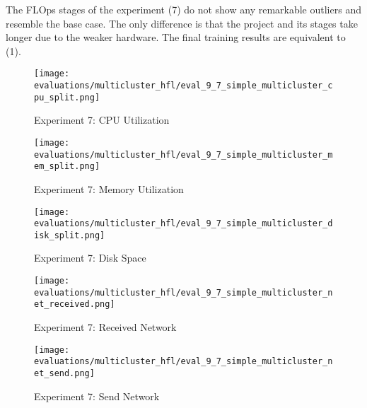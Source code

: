 The FLOps stages of the experiment (7) do not show any remarkable outliers and resemble the base case.
The only difference is that the project and its stages take longer due to the weaker hardware.
The final training results are equivalent to (1).

\begin{figure}[H]
    \begin{adjustwidth}{-0.2\paperwidth}{-0.2\paperwidth}
        \centering
        \texttt{[image: evaluations/multicluster\_hfl/eval\_9\_7\_simple\_multicluster\_cpu\_split.png]}
        \caption{Experiment 7: CPU Utilization}
        \label{fig:eval_7_cpu}
    \end{adjustwidth}
\end{figure}

\begin{figure}[H]
    \begin{adjustwidth}{-0.2\paperwidth}{-0.2\paperwidth}
        \centering
        \texttt{[image: evaluations/multicluster\_hfl/eval\_9\_7\_simple\_multicluster\_mem\_split.png]}
        \caption{Experiment 7: Memory Utilization}
        \label{fig:eval_7_mem}
    \end{adjustwidth}
\end{figure}

\begin{figure}[H]
    \begin{adjustwidth}{-0.2\paperwidth}{-0.2\paperwidth}
        \centering
        \texttt{[image: evaluations/multicluster\_hfl/eval\_9\_7\_simple\_multicluster\_disk\_split.png]}
        \caption{Experiment 7: Disk Space}
        \label{fig:eval_7_disk_space}
    \end{adjustwidth}
\end{figure}

\begin{figure}[H]
    \begin{adjustwidth}{-0.2\paperwidth}{-0.2\paperwidth}
        \centering
        \texttt{[image: evaluations/multicluster\_hfl/eval\_9\_7\_simple\_multicluster\_net\_received.png]}
        \caption{Experiment 7: Received Network}
        \label{fig:eval_7_net_received}
    \end{adjustwidth}
\end{figure}

\begin{figure}[H]
    \begin{adjustwidth}{-0.2\paperwidth}{-0.2\paperwidth}
        \centering
        \texttt{[image: evaluations/multicluster\_hfl/eval\_9\_7\_simple\_multicluster\_net\_send.png]}
        \caption{Experiment 7: Send Network}
        \label{fig:eval_7_net_send}
    \end{adjustwidth}
\end{figure}

